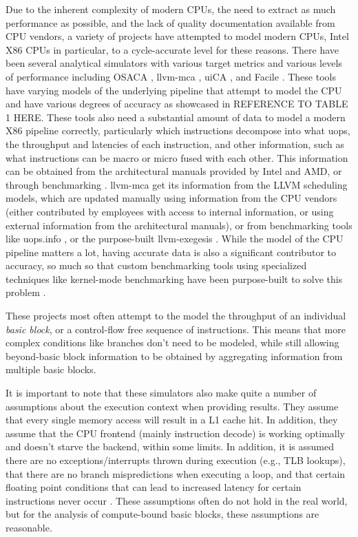\documentclass[sigconf]{acmart}
\begin{document}
Due to the inherent complexity of modern CPUs, the need to extract as much performance as possible, and the lack
of quality documentation available from CPU vendors, a variety of projects have attempted to model modern CPUs,
Intel X86 CPUs in particular, to a cycle-accurate level for these reasons. There have been several analytical
simulators with various target metrics and various levels of performance including OSACA \cite{laukemann2018osaca},
llvm-mca \cite{dibiagio2018mca}, uiCA \cite{abel2022uica}, and Facile \cite{abel2023facile}. These tools have varying
models of the underlying pipeline that attempt to model the CPU and have various degrees of accuracy as showcased in
REFERENCE TO TABLE 1 HERE. These tools also need a substantial amount of data to model a modern X86 pipeline correctly,
particularly which instructions decompose into what uops, the throughput and latencies of each instruction, and other
information, such as what instructions can be macro or micro fused with each other. This information can be obtained
from the architectural manuals provided by Intel and AMD, or through benchmarking \cite{abel2019uopsinfo}
\cite{courbet2018exegesis}. llvm-mca get its information from the LLVM \cite{lattner2004llvm} scheduling models,
which are updated manually using information from the CPU vendors (either contributed by employees with access to
internal information, or using external information from the architectural manuals), or from benchmarking tools
like uops.info \cite{abel2019uopsinfo}, or the purpose-built llvm-exegesis \cite{courbet2018exegesis}. While the model
of the CPU pipeline matters a lot, having accurate data is also a significant contributor to accuracy, so much so
that custom benchmarking tools using specialized techniques like kernel-mode benchmarking have been purpose-built to
solve this problem \cite{abel2020nanobench}.

These projects most often attempt to the model the throughput of an individual \textit{basic block}, or a
control-flow free sequence of instructions. This means that more complex conditions like branches don't need
to be modeled, while still allowing beyond-basic block information to be obtained by aggregating information
from multiple basic blocks.

It is important to note that these simulators also make quite a number of assumptions about the execution context
when providing results. They assume that every single memory access will result in a L1 cache hit. In addition,
they assume that the CPU frontend (mainly instruction decode) is working optimally and doesn't starve the backend,
within some limits. In addition, it is assumed there are no exceptions/interrupts thrown during execution (e.g.,
TLB lookups), that there are no branch mispredictions when executing a loop, and that certain floating point
conditions that can lead to increased latency for certain instructions never occur \cite{abel2022uica}. These
assumptions often do not hold in the real world, but for the analysis of compute-bound basic blocks, these
assumptions are reasonable.
\end{document}

